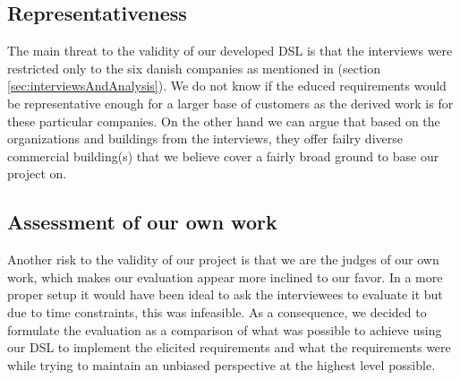 \subsection{Representativeness}
The main threat to the validity of our developed DSL is that the interviews were restricted only to the six danish companies as mentioned in  (section \ref{sec:interviewsAndAnalysis}). We do not know if the educed requirements would be representative enough for a larger base of customers as the derived work is for these particular companies. On the other hand we can argue that based on the organizations and buildings from the interviews, they offer failry diverse commercial building(s) that we believe cover a fairly broad ground to base our project on.

\subsection{Assessment of our own work}
Another risk to the validity of our project is that we are the judges of our own work, which makes our evaluation appear more inclined to our favor. In a more proper setup it would have been ideal to ask the interviewees to evaluate it but due to time constraints, this was infeasible. As a consequence, we decided to formulate the evaluation as a comparison of what was possible to achieve using our DSL to implement the elicited requirements and what the requirements were while trying to maintain an unbiased perspective at the highest level possible. 

\begin{comment}
\subsection{Insignificant Statistics}
Last but not least, a minor internal threat related to the representativeness of our DSL is the limited number of the interviews. Had we conducted more interviews on diverse companies, we might have a better understanding of their needs, for instance which components are most necessary or preferred. Still, the user's ability to define new components, rooms, policies etc. makes our language so flexible that eliminates the two aforementioned validity risks successfully.
\end{comment}